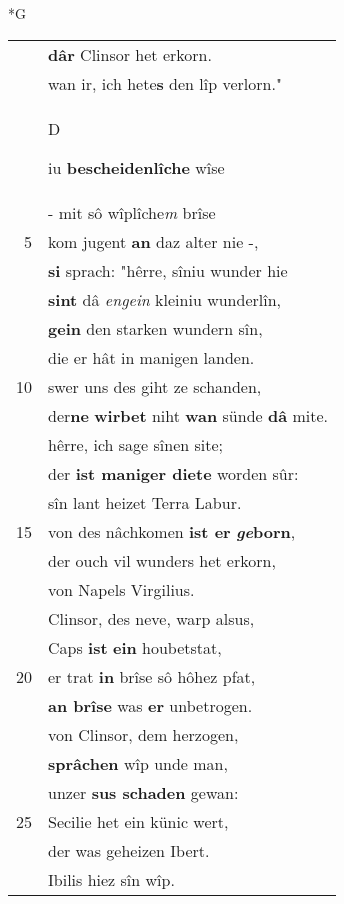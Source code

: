 \documentclass[8pt,a4paper,notitlepage]{article}
\begin{document}
\begin{table}[ht]
\begin{minipage}[t]{0.5\linewidth}
\small
\begin{center}*G
\end{center}
\begin{tabular}{rl}
 & \textbf{dâr} Clinsor het erkorn.\\ 
 & wan ir, ich hete\textbf{s} den lîp verlorn."\\ 
 & \begin{large}D\end{large}iu \textbf{bescheidenlîche} wîse\\ 
 & - mit sô wîplîche\textit{m} brîse\\ 
5 & kom jugent \textbf{an} daz alter nie -,\\ 
 & \textbf{si} sprach: "hêrre, sîniu wunder hie\\ 
 & \textbf{sint} dâ \textit{engein} kleiniu wunderlîn,\\ 
 & \textbf{gein} den starken wundern sîn,\\ 
 & die er hât in manigen landen.\\ 
10 & swer uns des giht ze schanden,\\ 
 & der\textbf{ne} \textbf{wirbet} niht \textbf{wan} sünde \textbf{dâ} mite.\\ 
 & hêrre, ich sage sînen site;\\ 
 & der \textbf{ist maniger diete} worden sûr:\\ 
 & sîn lant heizet Terra Labur.\\ 
15 & von des nâchkomen \textbf{ist er} \textbf{\textit{ge}born},\\ 
 & der ouch vil wunders het erkorn,\\ 
 & von Napels Virgilius.\\ 
 & Clinsor, des neve, warp alsus,\\ 
 & Caps \textbf{ist} \textbf{ein} houbetstat,\\ 
20 & er trat \textbf{in} brîse sô hôhez pfat,\\ 
 & \textbf{an brîse} was \textbf{er} unbetrogen.\\ 
 & von Clinsor, dem herzogen,\\ 
 & \textbf{sprâchen} wîp unde man,\\ 
 & unzer \textbf{sus schaden} gewan:\\ 
25 & Secilie het ein künic wert,\\ 
 & der was geheizen Ibert.\\ 
 & Ibilis hiez sîn wîp.\\ 

\end{tabular}
\end{minipage}
\end{table}
\end{document}
